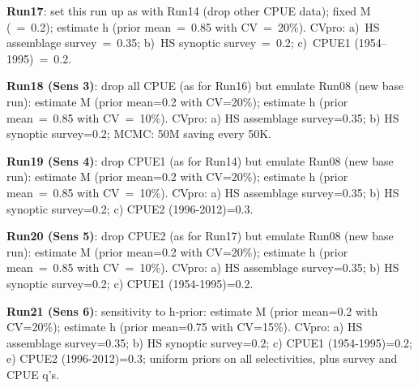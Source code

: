 {\bf Run17}: set this run up as with Run14 (drop other CPUE data);  fixed M (~=~0.2); estimate h (prior mean~=~0.85 with CV~=~20\%).  CVpro: a)~HS assemblage survey~=~0.35; b)~HS synoptic survey~=~0.2; c)~CPUE1 (1954--1995)~=~0.2. \newline

{\bf Run18 (Sens 3)}: drop all CPUE (as for Run16) but emulate Run08 (new base run): estimate M (prior mean=0.2 with CV=20\%); estimate h (prior mean~=~0.85 with CV~=~10\%).  CVpro: a) HS assemblage survey=0.35; b) HS synoptic survey=0.2; MCMC: 50M saving every 50K. \newline

{\bf Run19 (Sens 4)}:  drop CPUE1 (as for Run14) but emulate Run08 (new base run): estimate M (prior mean=0.2 with CV=20\%); estimate h (prior mean~=~0.85 with CV~=~10\%).  CVpro: a) HS assemblage survey=0.35; b) HS synoptic survey=0.2; c) CPUE2 (1996-2012)=0.3.  \newline

{\bf Run20 (Sens 5)}: drop CPUE2 (as for Run17) but emulate Run08 (new base run): estimate M (prior mean=0.2 with CV=20\%); estimate h (prior mean~=~0.85 with CV~=~10\%).  CVpro: a) HS assemblage survey=0.35; b) HS synoptic survey=0.2; c) CPUE1 (1954-1995)=0.2. \newline

{\bf Run21 (Sens 6)}: sensitivity to h-prior: estimate M (prior mean=0.2 with CV=20\%); estimate h (prior mean=0.75 with CV=15\%).  CVpro: a) HS assemblage survey=0.35; b) HS synoptic survey=0.2; c) CPUE1 (1954-1995)=0.2; e) CPUE2 (1996-2012)=0.3; uniform priors on all selectivities, plus survey and CPUE q's. \newline



